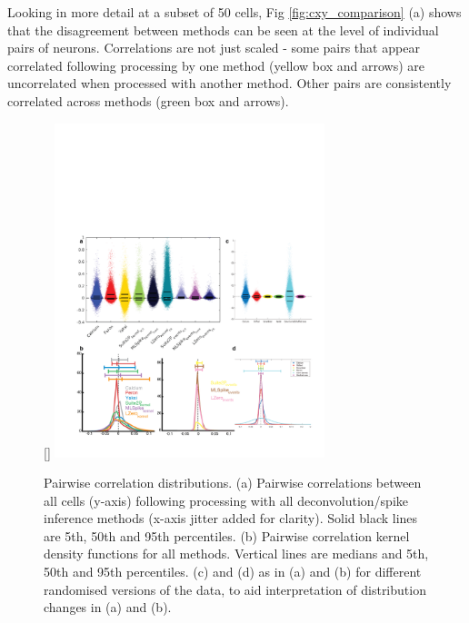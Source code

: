 \documentclass[a4paper,10pt,twocolumn]{article}
\begin{document}
Looking in more detail at a subset of 50 cells, Fig \ref{fig:cxy_comparison} (a) shows that the disagreement between methods can be seen at the level of individual pairs of neurons.  Correlations are not just scaled - some pairs that appear correlated following processing by one method (yellow box and arrows) are uncorrelated when processed with another method. Other pairs are consistently correlated across methods (green box and arrows). 

\begin{figure}
[\FBwidth]
{\includegraphics[trim={23 23 10 120}, clip, width=0.7\textwidth]{full_figs/why_deconvolve_F9_2.png}}
{\caption{\label{fig:cxy_dist}Pairwise correlation distributions. (a) Pairwise correlations between all cells (y-axis) following processing with all deconvolution/spike inference methods (x-axis jitter added for clarity). Solid black lines are 5th, 50th and 95th percentiles. (b) Pairwise correlation kernel density functions for all methods.  Vertical lines are medians and 5th, 50th and 95th percentiles. (c) and (d) as in (a) and (b) for different randomised versions of the data, to aid interpretation of distribution changes in (a) and (b).}}
\end{figure}
\end{document}
